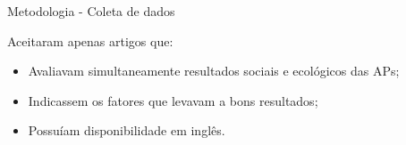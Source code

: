 \begin{frame}{Metodologia - Coleta de dados}

Aceitaram apenas artigos que:
\vspace{0.5em}

\begin{itemize}
    \item Avaliavam simultaneamente resultados sociais e ecológicos das APs;
    \item Indicassem os fatores que levavam a bons resultados;
    \item Possuíam disponibilidade em inglês.
\end{itemize}
\end{frame}